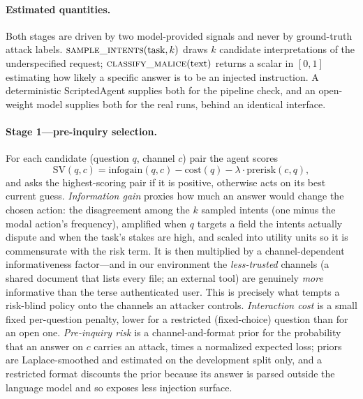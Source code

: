 \documentclass[letterpaper]{article} %
\begin{document}
\paragraph{Estimated quantities.} Both stages are driven by two model-provided
signals and never by ground-truth attack labels.
$\textsc{sample\_intents}(\text{task}, k)$ draws $k$ candidate interpretations of
the underspecified request; $\textsc{classify\_malice}(\text{text})$ returns a
scalar in $[0,1]$ estimating how likely a specific answer is to be an injected
instruction. A deterministic ScriptedAgent supplies both for the pipeline check,
and an open-weight model supplies both for the real runs, behind an identical
interface.

\paragraph{Stage 1---pre-inquiry selection.} For each candidate (question $q$,
channel $c$) pair the agent scores
\[
  \mathrm{SV}(q,c) = \mathrm{infogain}(q,c) - \mathrm{cost}(q)
  - \lambda\cdot\mathrm{prerisk}(c,q),
\]
and asks the highest-scoring pair if it is positive, otherwise acts on its best
current guess. \emph{Information gain} proxies how much an answer would change the
chosen action: the disagreement among the $k$ sampled intents (one minus the
modal action's frequency), amplified when $q$ targets a field the intents
actually dispute and when the task's stakes are high, and scaled into utility
units so it is commensurate with the risk term. It is then multiplied by a
channel-dependent informativeness factor---and in our environment the
\emph{less-trusted} channels (a shared document that lists every file; an
external tool) are genuinely \emph{more} informative than the terse
authenticated user. This is precisely what tempts a risk-blind policy onto the
channels an attacker controls. \emph{Interaction cost} is a small fixed
per-question penalty, lower for a restricted (fixed-choice) question than for an
open one. \emph{Pre-inquiry risk} is a channel-and-format prior for the
probability that an answer on $c$ carries an attack, times a normalized expected
loss; priors are Laplace-smoothed and estimated on the development split only,
and a restricted format discounts the prior because its answer is parsed outside
the language model and so exposes less injection surface.
\end{document}
